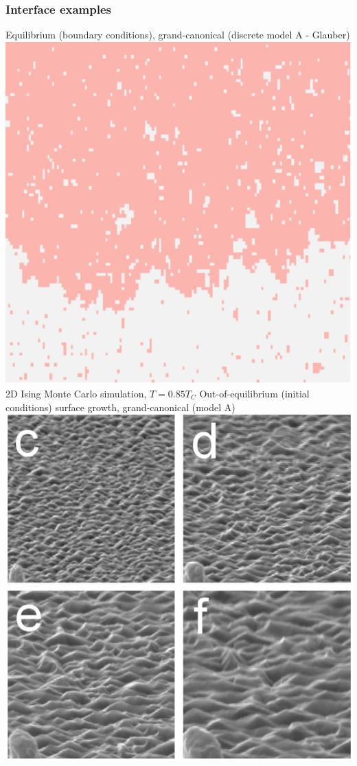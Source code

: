 \documentclass[9pt, dvipsnames,aspectratio=169]{beamer} %
\begin{document}
\begin{frame}
    \frametitle{Interface examples}
    \begin{overprint}
            Equilibrium (boundary conditions), grand-canonical (discrete model A - Glauber) \\
	        \centering       
		    \includegraphics[scale=0.7]{t-85.pdf} \\
		    2D Ising Monte Carlo simulation, $T=0.85 T_C$
            Out-of-equilibrium (initial conditions) surface growth, grand-canonical (model A) \\
	        \centering       
		    \includegraphics[scale=0.2]{crystal-growth.png} \\

\end{overprint}
\end{frame}
\end{document}
